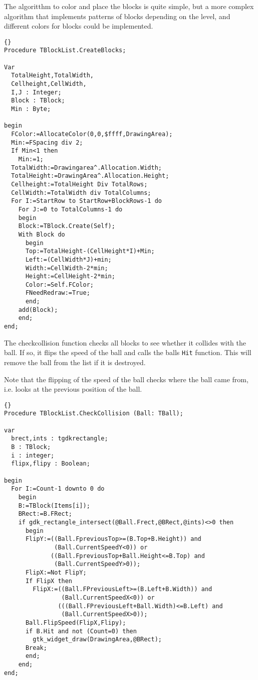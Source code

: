 \documentclass[10pt]{article}
\newcommand{\var}[1]{\texttt{#1}}
\begin{document}
The algoritthm to color and place the blocks is quite simple, but a more 
complex algorithm that implements patterns of blocks depending on the 
level, and different colors for blocks could be implemented.
\begin{lstlisting}{}
Procedure TBlockList.CreateBlocks;

Var
  TotalHeight,TotalWidth,
  Cellheight,CellWidth,
  I,J : Integer;
  Block : TBlock;
  Min : Byte;
  
begin
  FColor:=AllocateColor(0,0,$ffff,DrawingArea);
  Min:=FSpacing div 2;
  If Min<1 then 
    Min:=1;
  TotalWidth:=Drawingarea^.Allocation.Width;
  TotalHeight:=DrawingArea^.Allocation.Height;
  Cellheight:=TotalHeight Div TotalRows;
  CellWidth:=TotalWidth div TotalColumns;
  For I:=StartRow to StartRow+BlockRows-1 do
    For J:=0 to TotalColumns-1 do
    begin
    Block:=TBlock.Create(Self);
    With Block do
      begin
      Top:=TotalHeight-(CellHeight*I)+Min;
      Left:=(CellWidth*J)+min;
      Width:=CellWidth-2*min;
      Height:=CellHeight-2*min;
      Color:=Self.FColor;
      FNeedRedraw:=True;
      end;
    add(Block);
    end;
end;
\end{lstlisting}
The checkcollision function checks all blocks to see whether it collides with the ball.
If so, it flips the speed of the ball and calls the balls \var{Hit} function. This will
remove the ball from the list if it is destroyed.

Note that the flipping of the speed of the ball checks where the ball came from, i.e.
looks at the previous position of the ball.
\begin{lstlisting}{}
Procedure TBlockList.CheckCollision (Ball: TBall);

var
  brect,ints : tgdkrectangle;
  B : TBlock;
  i : integer;
  flipx,flipy : Boolean;
    
begin
  For I:=Count-1 downto 0 do
    begin
    B:=TBlock(Items[i]);
    BRect:=B.FRect;    
    if gdk_rectangle_intersect(@Ball.Frect,@BRect,@ints)<>0 then
      begin
      FlipY:=((Ball.FpreviousTop>=(B.Top+B.Height)) and 
              (Ball.CurrentSpeedY<0)) or
             ((Ball.FpreviousTop+Ball.Height<=B.Top) and 
              (Ball.CurrentSpeedY>0));
      FlipX:=Not FlipY;
      If FlipX then
        FlipX:=((Ball.FPreviousLeft>=(B.Left+B.Width)) and 
                (Ball.CurrentSpeedX<0)) or
               (((Ball.FPreviousLeft+Ball.Width)<=B.Left) and 
                (Ball.CurrentSpeedX>0));
      Ball.FlipSpeed(FlipX,Flipy);
      if B.Hit and not (Count=0) then 
        gtk_widget_draw(DrawingArea,@BRect);
      Break;
      end;
    end;
end;
\end{lstlisting}
\end{document}
